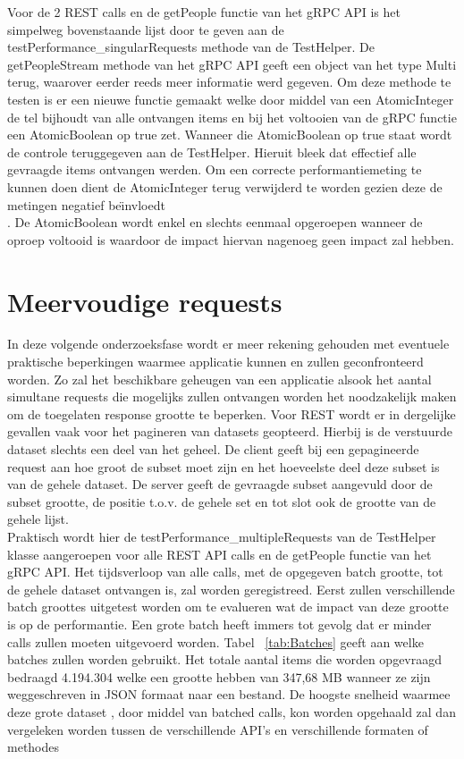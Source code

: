 Voor de 2 REST calls en de getPeople functie van het gRPC API is het simpelweg bovenstaande lijst door te geven aan de testPerformance\_singularRequests methode
van de TestHelper. De getPeopleStream methode van het gRPC API geeft een object van het type Multi terug, waarover eerder reeds meer informatie werd gegeven.
Om deze methode te testen is er een nieuwe functie gemaakt welke door middel van een AtomicInteger de tel bijhoudt van alle ontvangen items en bij het voltooien van
de gRPC functie een AtomicBoolean op true zet. Wanneer die AtomicBoolean op true staat wordt de controle teruggegeven aan de TestHelper. Hieruit bleek dat effectief
alle gevraagde items ontvangen werden. Om een correcte performantiemeting te kunnen doen dient de AtomicInteger terug verwijderd te worden gezien deze de metingen
negatief be\"{\i}nvloedt\"\\. De AtomicBoolean wordt enkel en slechts eenmaal opgeroepen wanneer de oproep voltooid is waardoor de impact hiervan nagenoeg geen impact zal hebben.

\section{Meervoudige requests}

In deze volgende onderzoeksfase wordt er meer rekening gehouden met eventuele praktische beperkingen waarmee applicatie kunnen en zullen geconfronteerd worden.
Zo zal het beschikbare geheugen van een applicatie alsook het aantal simultane requests die mogelijks zullen ontvangen worden het noodzakelijk maken om
de toegelaten response grootte te beperken. Voor REST wordt er in dergelijke gevallen vaak voor het pagineren van datasets geopteerd.
Hierbij is de verstuurde dataset slechts een deel van het geheel. De client geeft bij een gepagineerde request aan hoe groot de subset moet zijn
en het hoeveelste deel deze subset is van de gehele dataset. De server geeft de gevraagde subset aangevuld door de subset grootte, de positie t.o.v. de gehele set
en tot slot ook de grootte van de gehele lijst.\\

Praktisch wordt hier de testPerformance\_multipleRequests van de TestHelper klasse aangeroepen voor alle REST API calls en de getPeople functie van het gRPC API.
Het tijdsverloop van alle calls, met de opgegeven batch grootte, tot de gehele dataset ontvangen is, zal worden geregistreed. Eerst zullen verschillende batch groottes
uitgetest worden om te evalueren wat de impact van deze grootte is op de performantie. Een grote batch heeft immers tot gevolg dat er minder calls zullen moeten uitgevoerd worden.\newline
Tabel ~\ref{tab:Batches} geeft aan welke batches zullen worden gebruikt. Het totale aantal items die worden opgevraagd bedraagd 4.194.304 welke een grootte hebben
van 347,68 MB wanneer ze zijn weggeschreven in JSON formaat naar een bestand. De hoogste snelheid waarmee deze grote dataset , door middel van batched calls, kon worden
opgehaald zal dan vergeleken worden tussen de verschillende API's en verschillende formaten of methodes\\

